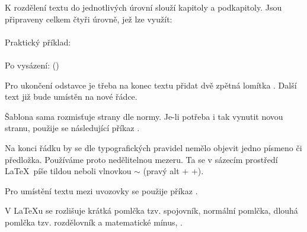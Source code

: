 \documentclass[a4paper, 12pt]{report}
\begin{document}
	K rozdělení textu do jednotlivých úrovní slouží kapitoly a podkapitoly. Jsou připraveny celkem čtyři úrovně, jež lze využít:\\
	\\
	Praktický příklad:\\
	\\
	Po vysázení: ()\\
	
	Pro ukončení odstavce je třeba na konec textu přidat dvě zpětná lomítka \strojopis{$\backslash \backslash$}. Další text již bude umístěn na nové řádce.
	
	Šablona sama rozmisťuje strany dle normy. Je-li potřeba i tak vynutit novou stranu, použije se následující příkaz .
	
	Na konci řádku by se dle typografických pravidel nemělo objevit jedno písmeno či předložka. Používáme proto nedělitelnou mezeru. Ta se v sázecím prostředí \LaTeX ~píše tildou neboli vlnovkou $\sim$ (pravý alt + +).
	
	Pro umístění textu mezi uvozovky se použije příkaz .
	
	V \LaTeX u se rozlišuje krátká pomlčka tzv. spojovník, normální pomlčka, dlouhá pomlčka tzv. rozdělovník a matematické mínus, .
	
\end{document}
